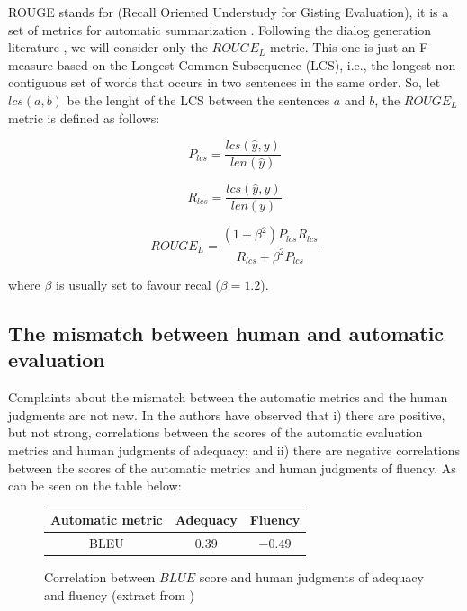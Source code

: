 ROUGE stands for (Recall Oriented Understudy for Gisting Evaluation), it is a set of metrics for automatic summarization \cite{Lin}. Following the dialog generation literature \cite{Lowe:2016}, we will consider only the $ROUGE_L$ metric. This one is just an F-measure based on the Longest Common Subsequence (LCS), i.e., the longest non-contiguous set of words that occurs in two sentences in the same order. So, let $lcs(a,b)$ be the lenght of the LCS between the sentences $a$ and $b$, the $ROUGE_L$ metric is defined as follows: 

\begin{equation}
P_{lcs} = \frac{lcs(\hat{y}, y)}{len(\hat{y})}
\end{equation}    


\begin{equation}
R_{lcs} = \frac{lcs(\hat{y}, y)}{len(y)}
\end{equation}

\begin{equation}
ROUGE_L = \frac{(1 + \beta^2) P_{lcs} R_{lcs}}{R_{lcs} + \beta^{2}P_{lcs}}
\end{equation}

where $\beta$ is usually set to favour recal ($\beta = 1.2$).

\subsection{The mismatch between human and automatic evaluation}

Complaints about the mismatch between the automatic metrics and the human judgments are not new. In  \cite{Stent} the authors have observed that i) there  are  positive,  but  not  strong,  correlations  between  the  scores  of the automatic evaluation metrics and human judgments of adequacy; and ii) there are negative correlations between the scores of the automatic metrics and human judgments of fluency. As can be seen on the table below:

\begin{figure}[h]
\label{stenttable}
\begin{center}
\begin{tabular}{|c|c|c|}
\hline
\cellcolor{blue!10} Automatic metric & \cellcolor{blue!10} Adequacy & \cellcolor{blue!10} Fluency \\ \hline
BLEU & $0.39$ & $-0.49$ \\ \hline
\end{tabular}
\end{center}
\caption{Correlation between $BLUE$ score and human judgments of adequacy and fluency (extract from \cite{Stent})}
\end{figure}

